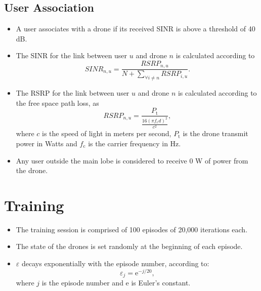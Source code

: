 \documentclass{IEEEtran}
\begin{document}
\subsection{User Association}
\begin{itemize}
    \item A user associates with a drone if its received SINR is above a threshold of 40 dB.
    \item The SINR for the link between user $u$ and drone $n$ is calculated according to
        \begin{equation}
            SINR_{n,u} = \frac{RSRP_{n, u}}{N + \sum_{\forall i \neq n} RSRP_{i, u}}.
        \end{equation}
    \item The RSRP for the link between user $u$ and drone $n$ is calculated according to the free space path loss, as
        \begin{equation}
            RSRP_{n,u} = \frac{P_\text{t}}{\frac{16 {(\pi  f_\text{c} d)}^2}{c^2}},
        \end{equation}
        where $c$ is the speed of light in meters per second, $P_\text{t}$ is the drone transmit power in Watts and $f_\text{c}$ is the carrier frequency in Hz.
    \item Any user outside the main lobe is considered to receive 0 W of power from the drone.
\end{itemize}
\section{Training}
\begin{itemize}
    \item The training session is comprised of 100 episodes of 20,000 iterations each.
    \item The state of the drones is set randomly at the beginning of each episode.
    \item $\varepsilon$ decays exponentially with the episode number, according to:
        \begin{equation}
            \varepsilon_j = \mathrm{e}^{-j/20},
        \end{equation}
        where $j$ is the episode number and $\mathrm{e}$ is Euler's constant.
\end{itemize}
\end{document}

